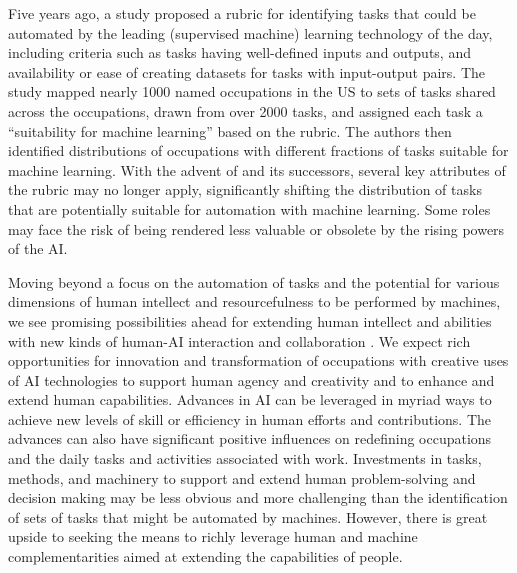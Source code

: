 Five years ago, a study \cite{brynjolfsson2017} proposed a rubric for identifying tasks that could be automated by the leading (supervised machine) learning technology of the day, including criteria such as tasks having well-defined inputs and outputs, and availability or ease of creating datasets for tasks with input-output pairs. The study mapped nearly 1000 named occupations in the US to sets of tasks shared across the occupations, drawn from over 2000 tasks, and assigned each task a ``suitability for machine learning'' based on the rubric. The authors then identified distributions of occupations with different fractions of tasks suitable for machine learning. With the advent of {\DV} and its successors, several key attributes of the rubric may no longer apply, significantly shifting the distribution of tasks that are potentially suitable for automation with machine learning. Some roles may face the risk of being rendered less valuable or obsolete by the rising powers of the AI. 

Moving beyond a focus on the automation of tasks and the potential for various dimensions of human intellect and resourcefulness to be performed by machines, we see promising possibilities ahead for extending human intellect and abilities with new kinds of human-AI interaction and collaboration \cite{tannerlecture2022}. We expect rich opportunities for innovation and transformation of occupations with creative uses of AI technologies to support human agency and creativity and to enhance and extend human capabilities. Advances in AI can be leveraged in myriad ways to achieve new levels of skill or efficiency in human efforts and contributions. The advances can also have significant positive influences on redefining occupations and the daily tasks and activities associated with work. Investments in tasks, methods, and machinery to support and extend human problem-solving and decision making may be less obvious and more challenging than the identification of sets of tasks that might be automated by machines.  However, there is great upside to seeking the means to richly leverage human and machine complementarities aimed at extending the capabilities of people.

